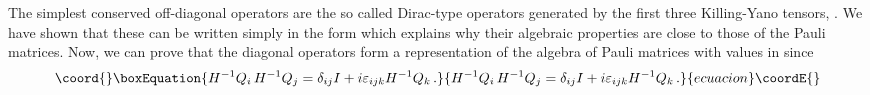 \documentclass[a4paper,12pt]{article}
\begin{document}
The simplest conserved off-diagonal operators  are the so called 
Dirac-type operators  generated by the first three Killing-Yano tensors, 
\coordHE{}. We have shown  \cite{CV2,CV3} that these can be written simply 
in the form \coordHE{} which explains why their 
algebraic properties are close to those of the Pauli matrices. Now, we 
can prove that the diagonal operators \coordHE{}  
form a representation of the algebra of Pauli matrices with values in 
\coordHE{} since
\begin{equation}\coord{}\boxEquation{
H^{-1}Q_{i}\,H^{-1}Q_{j}=\delta_{ij}I+i\varepsilon_{ijk}H^{-1}Q_{k}\,.
}{
H^{-1}Q_{i}\,H^{-1}Q_{j}=\delta_{ij}I+i\varepsilon_{ijk}H^{-1}Q_{k}\,.
}{ecuacion}\coordE{}\end{equation}
\end{document}
